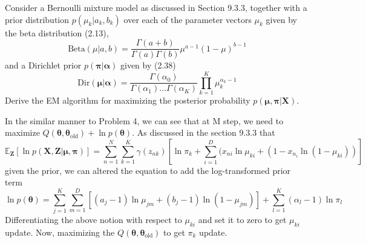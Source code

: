 \documentclass{article}
\begin{document}
Consider a Bernoulli mixture model as discussed in Section 9.3.3, together with a prior distribution 
$p(\mu_k|a_k, b_k)$ over each of the parameter vectors $\mu_k$ given by the beta distribution (2.13), 
\begin{equation}
    \text{Beta}(\mu|a,b) = \frac{\Gamma(a+b)}{\Gamma(a)\Gamma(b)} \mu^{a-1} (1-\mu)^{b-1}
\end{equation}
and a Dirichlet prior $p(\bm{\pi}|\bm{\alpha})$ given by (2.38)
\begin{equation}
    \text{Dir}(\bm{\mu}|\bm{\alpha}) = \frac{\Gamma(\alpha_0)}{\Gamma(\alpha_1)\dots\Gamma(\alpha_K)} \prod_{k=1}^K \mu_k^{\alpha_k-1}
\end{equation}
Derive the EM algorithm for maximizing the posterior 
probability $p(\bm{\mu},\bm{\pi}|\mathbf{X})$.
\color{blue}
\begin{sol}
In the similar manner to Problem 4, we can see that at M step, we need to maximize $Q(\bm{\theta}, \bm{\theta}_{\text{old}}) + \ln p(\bm{\theta})$.
As discussed in the section 9.3.3 that
\begin{equation}
    \mathbb{E}_\mathbf{Z}[\ln p(\mathbf{X},\mathbf{Z}| \bm{\mu},\bm{\pi})] = \sum_{n=1}^N \sum_{k=1}^K \gamma(z_{nk})\left[\ln \pi_k + \sum_{i=1}^D (x_{ni}\ln \mu_{ki} + (1-x_{n_i}\ln(1-\mu_{ki}))\right]
\end{equation}
given the prior, we can altered the equation to add the log-transformed prior term
$$\ln p(\bm{\theta}) = \sum_{j=1}^K\sum_{m=1}^D \left[(a_j-1)\ln \mu_{jm} + (b_j-1)\ln(1-\mu_{jm})\right] + \sum_{l=1}^K (\alpha_l-1) \ln \pi_l$$
Differentiating the above notion with respect to $\mu_{ki}$ and set it to zero to get $\mu_{ki}$ update. Now, maximizing the $Q(\bm{\theta}, \bm{\theta}_{\text{old}})$ to get $\pi_k$ update.
\end{sol}
\color{black}
\end{document}
